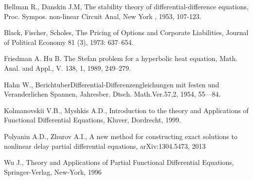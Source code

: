\begin{thebibliography}{99}
Bellman R., Danskin J.M, The stability theory of differential-difference equations, Proc. Sympos. non-linear Circuit Anal, New York , 1953, 107-123.

Black, Fischer, Scholes, The Pricing of Options and Corporate Liabilities, Journal of Political Economy 81 (3), 1973: 637–654.

Friedman A. Hu B. The Stefan problem for a hyperbolic heat equation, Math. Anal. and Appl., V. 138, 1, 1989, 249–279.

Hahn W., BerichtuberDifferential-Differenzengleichungen mit festen und Veranderlichen Spannen, Jahresber. Dtsch. Math.Ver.57,2, 1954, 55—84.

Kolmanovskii V.B., Myshkis A.D., Introduction to the theory and Applications of Functional Differential Equations, Kluver, Dordrecht, 1999.

Polyanin A.D., Zhurov A.I., A new method for constructing exact solutions to nonlinear delay partial differential equations, arXiv:1304.5473, 2013

Wu J., Theory and Applications of Partial Functional Differential Equations, Springer-Verlag, New-York, 1996

\end{thebibliography}
